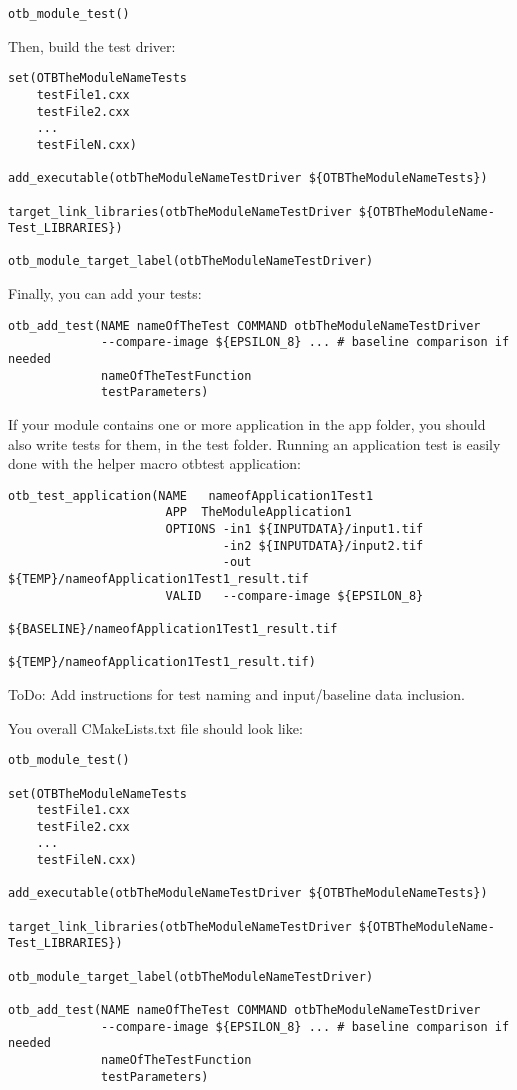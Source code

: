 \begin{verbatim}
otb_module_test()
\end{verbatim}

Then, build the test driver:

\begin{verbatim}
set(OTBTheModuleNameTests
    testFile1.cxx
    testFile2.cxx
    ...
    testFileN.cxx)

add_executable(otbTheModuleNameTestDriver ${OTBTheModuleNameTests})

target_link_libraries(otbTheModuleNameTestDriver ${OTBTheModuleName-Test_LIBRARIES})

otb_module_target_label(otbTheModuleNameTestDriver)
\end{verbatim}

Finally, you can add your tests:

\begin{verbatim}
otb_add_test(NAME nameOfTheTest COMMAND otbTheModuleNameTestDriver
             --compare-image ${EPSILON_8} ... # baseline comparison if needed
             nameOfTheTestFunction
             testParameters)
\end{verbatim}

If your module contains one or more application in the app folder, you should
also write tests for them, in the test folder. Running an application test is
easily done with the helper macro otb\textunderscore test\textunderscore
application:

\begin{verbatim}
otb_test_application(NAME   nameofApplication1Test1
                      APP  TheModuleApplication1
                      OPTIONS -in1 ${INPUTDATA}/input1.tif
                              -in2 ${INPUTDATA}/input2.tif
                              -out ${TEMP}/nameofApplication1Test1_result.tif
                      VALID   --compare-image ${EPSILON_8}
                              ${BASELINE}/nameofApplication1Test1_result.tif
                              ${TEMP}/nameofApplication1Test1_result.tif)
\end{verbatim}

ToDo: Add instructions for test naming and input/baseline data inclusion.

You overall CMakeLists.txt file should look like:

\begin{verbatim}
otb_module_test()

set(OTBTheModuleNameTests
    testFile1.cxx
    testFile2.cxx
    ...
    testFileN.cxx)

add_executable(otbTheModuleNameTestDriver ${OTBTheModuleNameTests})

target_link_libraries(otbTheModuleNameTestDriver ${OTBTheModuleName-Test_LIBRARIES})

otb_module_target_label(otbTheModuleNameTestDriver)

otb_add_test(NAME nameOfTheTest COMMAND otbTheModuleNameTestDriver
             --compare-image ${EPSILON_8} ... # baseline comparison if needed
             nameOfTheTestFunction
             testParameters)
\end{verbatim}

